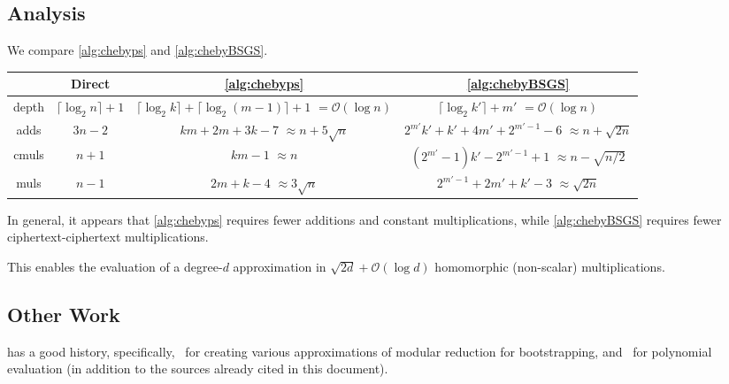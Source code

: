 \documentclass[../fheimpl.tex]{subfiles}
\begin{document}
	\subsection{Analysis}
	\label{sec:evalanalysis}
	We compare \cref{alg:chebyps} and \cref{alg:chebyBSGS}. 
	\begin{center}
		\begin{tabular}{ |c|c|c|c| } 
			\hline
			& Direct & \cref{alg:chebyps} & \cref{alg:chebyBSGS} \\ 
			\hline
			{\small depth} & $\lceil\log_2{n}\rceil + 1$ & {\small $\lceil\log_2{k}\rceil + \lceil\log_2{(m - 1)}\rceil + 1$} $= \mathcal{O}(\log{n})$ & {\small $\lceil\log_2{k'}\rceil+m'$} $= \mathcal{O}(\log{n})$ \\
			{\small adds}  & $3n-2$ & {\small $km+2m+3k-7$} $\approx n+5\sqrt{n}$ & {\small $2^{m'}k'+k'+4m'+2^{m'-1}-6$} $\approx n + \sqrt{2n}$        \\ 
			{\small cmuls} & $n+1$ & {\small $km - 1$} $\approx n$ & {\small $(2^{m'}-1)k'-2^{m'-1}+1$} $\approx n - \sqrt{n/2}$        \\ 
			{\small muls}  & $n-1$ & {\small $2m+k-4$} $\approx 3\sqrt{n}$   & {\small $2^{m'-1}+2m'+k'-3$} $\approx \sqrt{2n}$ \\
			\hline
		\end{tabular}
	\end{center}
	
	In general, it appears that \cref{alg:chebyps} requires fewer additions and constant multiplications, while \cref{alg:chebyBSGS} requires fewer ciphertext-ciphertext multiplications.
	
	This enables the evaluation of a degree-$d$ approximation in $\sqrt{2d}+\mathcal{O}(\log{d})$ homomorphic (non-scalar) multiplications.
	
	
	\subsection{Other Work}
	\cite{cryptoeprint:2020/1549} has a good history, specifically,~\cite{cryptoeprint:2020/488, cryptoeprint:2020/1355, cryptoeprint:2020/552} for creating various approximations of modular reduction for bootstrapping, and~\cite{cryptoeprint:2020/552,cryptoeprint:2020/1203} for polynomial evaluation (in addition to the sources already cited in this document).
	
\end{document}
